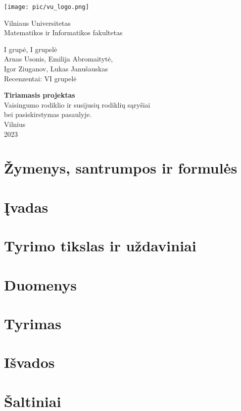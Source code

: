 \documentclass[12pt]{article}
\begin{document}
\begin{titlepage}
    \centering
    \texttt{[image: pic/vu\_logo.png]} \\
    {\Huge
    Vilniaus Universitetas \\
    Matematikos ir Informatikos fakultetas\par} 
    \vspace{2cm}
    
    \Large
    {I grupė, I grupelė \\
    Arnas Usonis, Emilija Abromaitytė, \\ Igor Ziuganov, Lukas Janušauskas \\
    Recenzentai: VI grupelė\par}
    \vspace{1cm}
    {\LARGE
    \textbf{Tiriamasis projektas \\}}
    \vspace{0.2cm}
    {\Large
    Vaisingumo rodiklio ir susijusių rodiklių sąryšiai \\ bei pasiskirstymas pasaulyje. \\}
    \vspace*{\fill}
    Vilnius \\ 2023
\end{titlepage}
\pagebreak

\normalsize
\tableofcontents
\pagebreak

\section{Žymenys, santrumpos ir formulės}

\pagebreak

\section{Įvadas}

\pagebreak

\section{Tyrimo tikslas ir uždaviniai}

\pagebreak

\section{Duomenys}

\pagebreak

\section{Tyrimas}

\pagebreak

\section{Išvados}

\pagebreak

\section{Šaltiniai}

\printbibliography
\end{document}
